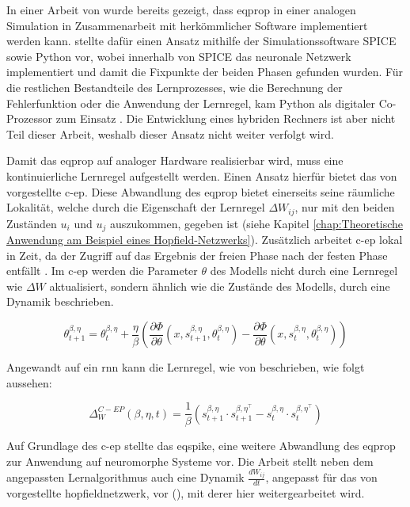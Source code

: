 In einer Arbeit von \citeauthor{Kendall2020} wurde bereits gezeigt, dass \gls{eqprop} in einer analogen Simulation in Zusammenarbeit mit herkömmlicher Software implementiert werden kann. \citeauthor{Kendall2020} stellte dafür einen Ansatz mithilfe der Simulationssoftware SPICE sowie Python vor, wobei innerhalb von SPICE das neuronale Netzwerk implementiert und damit die Fixpunkte der beiden Phasen gefunden wurden. Für die restlichen Bestandteile des Lernprozesses, wie die Berechnung der Fehlerfunktion oder die Anwendung der Lernregel, kam Python als digitaler Co-Prozessor zum Einsatz \cite[vgl. S. 27]{Kendall2020}. Die Entwicklung eines hybriden Rechners ist aber nicht Teil dieser Arbeit, weshalb dieser Ansatz nicht weiter verfolgt wird.

Damit das \gls{eqprop} auf analoger Hardware realisierbar wird, muss eine kontinuierliche Lernregel aufgestellt werden. Einen Ansatz hierfür bietet das \citeyear{Ernoult2020} von \citeauthor{Ernoult2020} vorgestellte \gls{c-ep}. Diese Abwandlung des \gls{eqprop} bietet einerseits seine räumliche Lokalität, welche durch die Eigenschaft der Lernregel \(\Delta W_{ij}\), nur mit den beiden Zuständen \(u_{i}\) und \(u_{j}\) auszukommen, gegeben ist (siehe Kapitel \ref{chap:Theoretische Anwendung am Beispiel eines Hopfield-Netzwerks}). Zusätzlich arbeitet \gls{c-ep} lokal in Zeit, da der Zugriff auf das Ergebnis der freien Phase nach der festen Phase entfällt \cite[vgl. S. 3 f.]{Ernoult2020}. Im \gls{c-ep} werden die Parameter \(\theta\) des Modells nicht durch eine Lernregel wie \(\Delta W\) aktualisiert, sondern ähnlich wie die Zustände des Modells, durch eine Dynamik beschrieben.

\[\theta^{\beta,\eta}_{t+1}={\theta^{\beta,\eta}_{t}}+\frac{\eta}{\beta}\left(\frac{\partial{\Phi}}{\partial{\theta}}(x,s^{\beta,\eta}_{t+1},\theta^{\beta,\eta}_{t})-\frac{\partial{\Phi}}{\partial{\theta}}(x,s^{\beta,\eta}_{t},\theta^{\beta,\eta}_{t})\right)\]

Angewandt auf ein \gls{rnn} kann die Lernregel, wie von \citeauthor{Ernoult2020} beschrieben, wie folgt aussehen:

\[\Delta^{C-EP}_W(\beta,\eta,t)=\frac{1}{\beta}(s^{\beta,\eta}_{t+1}\cdot s^{\beta,\eta^{\intercal}}_{t+1}-s^{\beta,\eta}_{t}\cdot s^{\beta,\eta^{\intercal}}_{t})\]

Auf Grundlage des \gls{c-ep} stellte \citeauthor{Martin2020} das \gls{eqspike}, eine weitere Abwandlung des \gls{eqprop} zur Anwendung auf neuromorphe Systeme vor. Die Arbeit stellt neben dem angepassten Lernalgorithmus auch eine Dynamik \(\frac{dW_{ij}}{dt}\), angepasst für das von \citeauthor{Scellier2017} vorgestellte \gls{hopfieldnetzwerk}, vor (\cite[vgl. S. 3]{Martin2020}), mit derer hier weitergearbeitet wird.

